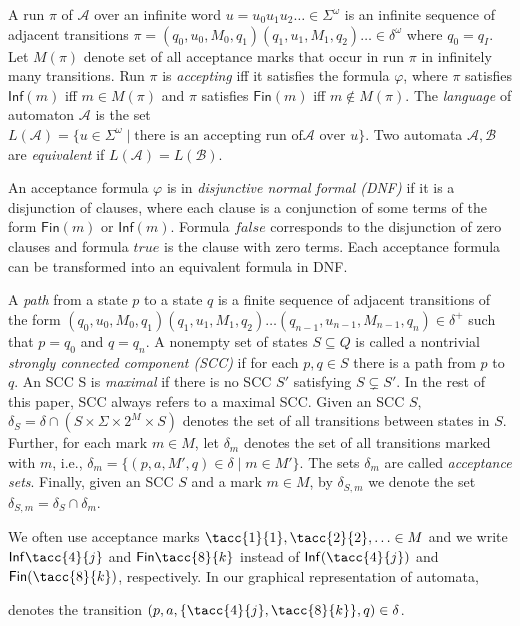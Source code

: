 \documentclass[runningheads]{llncs}
\def\Inf{\ensuremath{\mathsf{Inf}}}
\def\Fin{\ensuremath{\mathsf{Fin}}}
\def\false{\mathit{false}}
\def\true{\mathit{true}}
\newcommand{\mA}{\mathcal{A}}
\newcommand{\mB}{\mathcal{B}}
\begin{document}
A run $\pi$ of $\mA$ over an infinite word
$u = u_{0}u_{1}u_{2}\dots \in \Sigma^{\omega}$ is an infinite sequence
of adjacent transitions
$\pi=(q_0,u_0,M_0,q_1)(q_1,u_1,M_1,q_2)\dots\in\delta^{\omega}$ where
$q_0=q_I$. Let $M(\pi)$ denote set of all acceptance marks that occur
in run $\pi$ in infinitely many transitions. Run $\pi$ is
\emph{accepting} iff it satisfies the formula $\varphi$, where $\pi$
satisfies $\Inf(m)$ iff $m\in M(\pi)$ and $\pi$ satisfies $\Fin(m)$
iff $m\not\in M(\pi)$. The \emph{language} of automaton $\mA$ is the
set
$L(\mA)=\{u\in \Sigma^{\omega}\mid\textrm{there is an accepting run of
}\mA\textrm{ over }u\}$. Two automata $\mA,\mB$ are \emph{equivalent}
if $L(\mA)=L(\mB)$.

An acceptance formula $\varphi$ is in \emph{disjunctive normal formal
  (DNF)} if it is a disjunction of clauses, where each clause is a
conjunction of some terms of the form $\Fin(m)$ or $\Inf(m)$.  Formula
$\false$ corresponds to the disjunction of zero clauses and formula
$\true$ is the clause with zero terms. Each acceptance formula can be
transformed into an equivalent formula in DNF.

A \emph{path} from a state $p$ to a state $q$ is a finite sequence of
adjacent transitions of the form
$(q_0,u_0,M_0,q_1)(q_1,u_1,M_1,q_2)\dots(q_{n-1},u_{n-1},M_{n-1},q_n)\in\delta^+$
such that $p=q_0$ and $q=q_n$. A nonempty set of states $S\subseteq Q$
is called a nontrivial \emph{strongly connected component (SCC)} if
for each $p,q\in S$ there is a path from $p$ to $q$. An SCC S is
\emph{maximal} if there is no SCC $S'$ satisfying $S\subsetneq S'$. In
the rest of this paper, SCC always refers to a maximal SCC. Given an
SCC $S$, $\delta_S=\delta\cap (S\times \Sigma \times 2^M \times S)$
denotes the set of all transitions between states in $S$. Further, for
each mark $m\in M$, let $\delta_m$ denotes the set of all transitions
marked with $m$, i.e., $\delta_m=\{(p,a,M',q)\in\delta\mid m\in
M'\}$. The sets $\delta_m$ are called \emph{acceptance sets}.
Finally, given an SCC $S$ and a mark $m\in M$, by $\delta_{S,m}$ we
denote the set $\delta_{S,m}=\delta_S\cap\delta_m$.

We often use acceptance marks $\tacc{1}{1},\tacc{2}{2},\ldots\in M$
and we write $\Inf\tacc{4}{j}$ and $\Fin\tacc{8}{k}$ instead of
$\Inf(\tacc{4}{j})$ and $\Fin(\tacc{8}{k})$, respectively. In our
graphical representation of automata,
denotes the transition $(p,a,\{\tacc{4}{j},\tacc{8}{k}\},q)\in\delta$.
\end{document}
